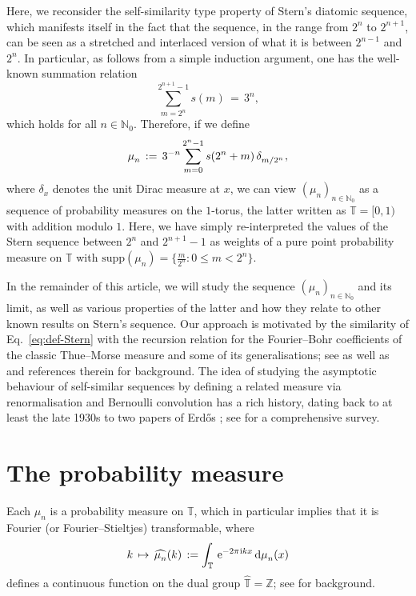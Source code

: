 \documentclass[11pt,a4paper]{amsart}
\theoremstyle{plain}
\theoremstyle{definition}
\numberwithin{equation}{section}
\newcommand{\dd}{\,\mathrm{d}}
\newcommand{\ii}{\ts\mathrm{i}}
\newcommand{\ee}{\,\mathrm{e}}
\newcommand{\ts}{\hspace{0.5pt}}
\newcommand{\ZZ}{\mathbb{Z}}
\newcommand{\NN}{\mathbb{N}}
\newcommand{\TT}{\mathbb{T}}
\begin{document}
Here, we reconsider the self-similarity type property of Stern's
diatomic sequence, which manifests itself in the fact that the
sequence, in the range from $2^n$ to $2^{n+1}$, can be seen as a
stretched and interlaced version of what it is between $2^{n-1}$ and
$2^n$. In particular, as follows from a simple induction argument, one
has the well-known summation relation
\begin{equation}\label{eq:sum}
     \sum_{m=2^n}^{2^{n+1} - 1} \!\! s(m) \, = \, 3^n ,
\end{equation}
which holds for all $n\in\NN_0$. Therefore, if we define
\begin{equation}\label{eq:def-meas}
   \mu^{}_{n} \, := \, 3^{-n} \sum_{m=0}^{2^n - 1}
   s(2^n + m) \, \delta^{}_{m / 2^{n}} \ts ,
\end{equation}
where $\delta_x$ denotes the unit Dirac measure at $x$, we can view
$(\mu^{}_{n})^{}_{n\in\NN_0}$ as a sequence of probability measures on
the $1$-torus, the latter written as $\TT=[0,1)$ with addition modulo
$1$. Here, we have simply re-interpreted the values of the Stern
sequence between $2^n$ and $2^{n+1}-1$ as weights of a pure point
probability measure on $\TT$ with
$\mathrm{supp} (\mu^{}_n ) = \big\{ \frac{m}{2^n} : 0 \leqslant m <
2^n \big\}$.

In the remainder of this article, we will study the sequence
$(\mu_{n})^{}_{n\in\NN_{0}}$ and its limit, as well as various
properties of the latter and how they relate to other known results on
Stern's sequence. Our approach is motivated by the similarity of
Eq.~\eqref{eq:def-Stern} with the recursion relation for the
Fourier--Bohr coefficients of the classic Thue{\ts}--Morse measure and
some of its generalisations; see \cite[Sec.~10.1]{TAO} as well as
\cite{BGG} and references therein for background. The idea of studying
the asymptotic behaviour of self-similar sequences by defining a
related measure via renormalisation and Bernoulli convolution has a
rich history, dating back to at least the late 1930s to two papers of
Erd\H{o}s \cite{E1939,E1940}; see \cite{PSS} for a comprehensive
survey.


\section{The probability measure}

Each $\mu^{}_n$ is a probability measure on $\TT$, which in particular
implies that it is Fourier (or Fourier--Stieltjes) transformable,
where
\[
    k \, \mapsto \, \widehat{\mu^{}_n} (k) 
    \, := \int_{\TT}
    \ee^{-2 \pi \ii k x} \dd \mu^{}_{n} (x) 
\]
defines a continuous function on the dual group $\widehat{\TT} = \ZZ$;
see \cite[Sec.~4.4]{RSt} for background.
\end{document}
